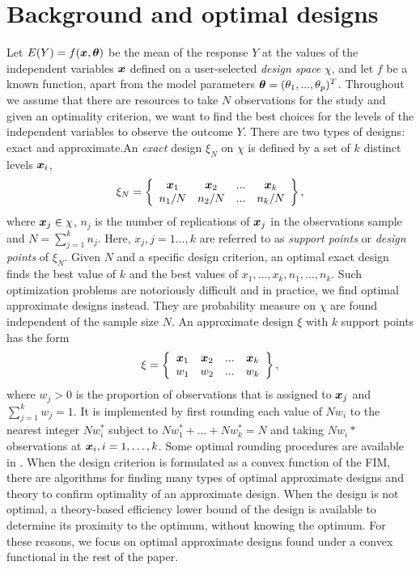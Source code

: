 \section{Background and optimal designs}
\label{sec:background}
Let $E(Y)=f(\boldsymbol{x},\boldsymbol{\theta})$ be the mean of the response $Y$ at the values of the independent variables $\boldsymbol{x}$  defined on   a user-selected   {\it design space} $\chi$, and let  $f$ be a known function, apart from the model parameters $\boldsymbol{\theta} = (\theta_1,..., \theta_p)^T$.  Throughout we assume that there are resources to take $N$ observations for the study and given an optimality criterion, we want to find the best choices for the levels of the independent variables to observe the outcome $Y$.  There are two types of designs: exact and approximate.An {\it exact}  design $\xi_N$ on $\chi$  is  defined by a set of $k$ distinct  levels $\boldsymbol{x}_i$,
\begin{equation}
\label{eq-exact-design}
\xi_N =
  \left\{
    \begin{array}{cccc}
    \boldsymbol{x}_1 & \boldsymbol{x}_2 & ... & \boldsymbol{x}_k\\
    n_1/N & n_2/N & ...& n_k/N
    \end{array}
    \right\},
\end{equation}
where $\boldsymbol{x}_j \in \chi$, $n_j$ is  the  number of replications of $\boldsymbol{x}_j$ in the observations sample and  $N = \sum_{j=1}^kn_j$.
Here, $x_j, j = 1..., k$  are  referred to as {\it support points} or {\it design points} of $\xi_N$.
Given $N$ and a specific design criterion, an optimal exact design finds the best value of $k$ and the best values of $x_1,\ldots,x_k,n_1,\ldots,n_k$.  Such optimization problems are notoriously difficult and in practice, we find optimal approximate designs instead.  They are probability measure on  $\chi$  are found   independent of the sample size $N$.
An approximate design $\xi$ with $k$ support points has the form
\begin{equation}
\label{eq-approximate-design}
\xi =
  \left\{
    \begin{array}{cccc}
    \boldsymbol{x}_1 & \boldsymbol{x}_2 & ... & \boldsymbol{x}_k\\
    w_1 & w_2 & ...& w_k
    \end{array}
    \right\},
\end{equation}
where $w_j> 0$ is the proportion of observations that is assigned to  $\boldsymbol{x}_j$ and $\sum_{j=1}^{k} w_j = 1$.
It is implemented by  first rounding each value of $Nw_i$ to the nearest integer $Nw_i^*$    subject to $Nw_1^*+\ldots+Nw_k^*=N$ and taking $Nw_i*$ observations at $\boldsymbol{x}_i,i=1,\ldots,k$.  Some optimal rounding procedures are available in \citet{pukelsheim1992}.
When the design criterion is formulated as a convex function of the FIM, there are algorithms for finding many types of optimal approximate designs and theory to   confirm optimality of an approximate design.  When the design is not optimal, a theory-based efficiency lower bound of the design is available to determine its proximity to the optimum, without knowing the optimum.  For these reasons, we focus on  optimal approximate designs found under a convex functional in the rest of the paper.


